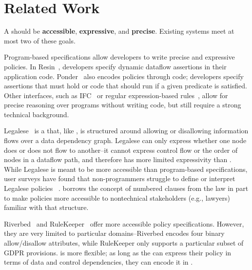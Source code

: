 \chapter{Related Work}

A \policylang{} should be \textbf{accessible}, \textbf{expressive}, and \textbf{precise}.
%
Existing systems meet at most two of these goals.
%

Program-based specifications allow developers to write precise and expressive policies.
%
In Resin~\cite{resin}, developers specify dynamic dataflow assertions in their application code.
%
Ponder~\cite{ponder} also encodes policies through code; 
developers specify assertions that must hold or code that should run if a given predicate is satisfied.
%
Other interfaces, such as IFC~\cite{jif} or regular expression-based rules~\cite{hotnets}, 
allow for precise reasoning over programs without writing code, 
but still require a strong technical background.

Legalese~\cite{legalese} is a \policylang{} that, like \syslang, 
is structured around allowing or disallowing information flows over a data dependency graph.
%
Legalese can only express whether one node does or does not flow to another--it 
cannot express control flow or the order of nodes in a dataflow path,
and therefore has more limited expressivity than \syslang.
%
While Legalese is meant to be more accessible than program-based specifications, 
user surveys have found that non-programmers struggle to define or interpret Legalese policies ~\cite{legalese, privguard}.
%
\syslang{} borrows the concept of numbered clauses from the law 
in part to make policies more accessible to nontechnical stakeholders (e.g., lawyers) familiar with that structure.
%

Riverbed~\cite{riverbed} and RuleKeeper~\cite{rulekeeper} offer more accessible policy specifications.
%
However, they are very limited to particular domains--Riverbed encodes four binary allow/disallow attributes, 
while RuleKeeper only supports a particular subset of GDPR provisions.
%
\syslang{} is more flexible; as long as the \ce{} can express their policy in terms of data and control dependencies,
they can encode it in \syslang{}.
